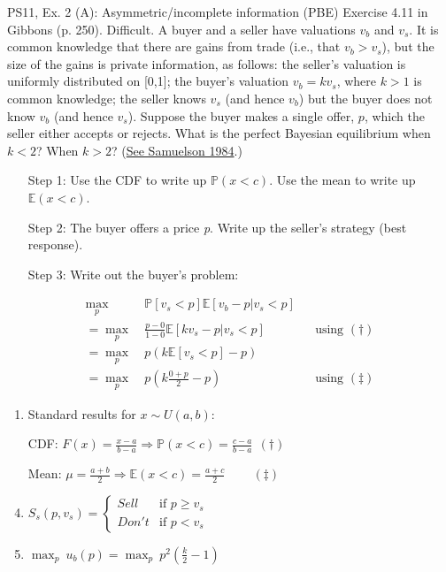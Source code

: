 \begin{frame}{PS11, Ex. 2 (A): Asymmetric/incomplete information (PBE)}
    Exercise 4.11 in Gibbons (p. 250). Difficult. A buyer and a seller have valuations $v_b$ and $v_s$. It is common knowledge that there are gains from trade (i.e., that $v_b > v_s$), but the size of the gains is private information, as follows: the seller’s valuation is uniformly distributed on [0,1]; the buyer’s valuation $v_b = kv_s$, where $k > 1$ is common knowledge; the seller knows $v_s$ (and hence $v_b$) but the buyer does not know $v_b$ (and hence $v_s$). Suppose the buyer makes a single offer, $p$, which the seller either accepts or rejects. What is the perfect Bayesian equilibrium when $k < 2$? When $k > 2$? (\href{https://www.jstor.org/stable/1911195}{See Samuelson 1984}.) \vspace{-8pt}
    \begin{multicols}{2}
      \begin{itemize}
        \item[Step 1:] Use the CDF to write up $\mathbb{P}(x<c)$. Use the mean to write up $\mathbb{E}(x<c)$.
        \item[Step 2:] The buyer offers a price \textit{p}. Write up the seller's strategy (best response).
        \item[Step 3:] Write out the buyer's problem:
      \end{itemize} \vspace{-8pt}
      \begin{align*}
        \displaystyle{\max_p}&\ \mathbb{P}[v_s<p]\mathbb{E}[v_b-p|v_s<p]\\
       =\displaystyle{\max_p}&\ \frac{p-0}{1-0}\mathbb{E}[kv_s-p|v_s<p]&&\text{using }(\dagger)\\
       =\displaystyle{\max_p}&\ p\left(k\mathbb{E}[v_s<p]-p\right)\\
       =\displaystyle{\max_p}&\ p\left(k\frac{0+p}{2}-p\right)&&\text{using }(\ddagger)
      \end{align*}
      \vfill\null\columnbreak
      \begin{enumerate}
        \item Standard results for $x\sim U(a, b):$
        \item[CDF:] $F(x)=\frac{x-a}{b-a}\Rightarrow\mathbb{P}(x<c)=\frac{c-a}{b-a}\ \ (\dagger)$
        \item[Mean:] $\mu=\frac{a+b}{2}\Rightarrow\mathbb{E}(x<c)=\frac{a+c}{2}\quad\quad\ (\ddagger)$
        \item $S_s(p,v_s)=\left\{\begin{array}{ll}
          Sell  & \text{if }p\geq v_s \\
          Don't & \text{if }p < v_s
        \end{array}\right.$
        \item $\displaystyle{\max_p}\ u_b(p)=\displaystyle{\max_p}\ p^2\left(\frac{k}{2}-1\right)$
      \end{enumerate}
      \vfill\null
    \end{multicols}
\end{frame}
